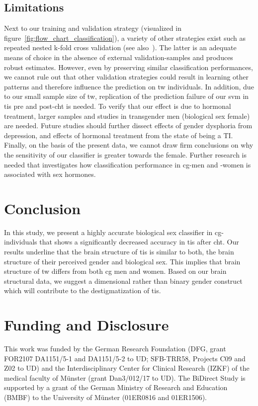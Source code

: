 \documentclass{article}
\begin{document}
    \subsection{Limitations}
    Next to our training and validation strategy (visualized in figure~\ref{fig:flow_chart_classification}), a variety of other strategies exist such as repeated nested k-fold cross validation (see also~\cite{Baldinger-Melich2019}). The latter is an adequate means of choice in the absence of external validation-samples and produces robust estimates. However, even by preserving similar classification performances, we cannot rule out that other validation strategies could result in learning other patterns and therefore influence the prediction on \ac{tw} individuals. In addition, due to our small sample size of \ac{tw}, replication of the prediction failure of our \ac{svm} in \acp{ti} pre and post-\ac{cht} is needed. To verify that our effect is due to hormonal treatment, larger samples and studies in transgender men (biological sex female) are needed. Future studies should further dissect effects of gender dysphoria from depression, and effects of hormonal treatment from the state of being a TI\@.
    Finally, on the basis of the present data, we cannot draw firm conclusions on why the sensitivity of our classifier is greater towards the female. Further research is needed that investigates how classification performance in \ac{cg}-men and -women is associated with sex hormones.


    \section{Conclusion}
    In this study, we present a highly accurate biological sex classifier in \ac{cg}-individuals that shows a significantly decreased accuracy in \acp{ti} after \ac{cht}. Our results underline that the brain structure of \acp{ti} is similar to both, the brain structure of their perceived gender and biological sex. This implies that brain structure of \ac{tw} differs from both cg men and women. Based on our brain structural data, we suggest a dimensional rather than binary gender construct which will contribute to the destigmatization of \acp{ti}.


    \section*{Funding and Disclosure}
    This work was funded by the German Research Foundation (DFG, grant FOR2107 DA1151/5-1 and DA1151/5-2 to UD; SFB-TRR58, Projects C09 and Z02 to UD) and the Interdisciplinary Center for Clinical Research (IZKF) of the medical faculty of Münster (grant Dan3/012/17 to UD). The BiDirect Study is supported by a grant of the German Ministry of Research and Education (BMBF) to the University of Münster (01ER0816 and 01ER1506).
\end{document}
